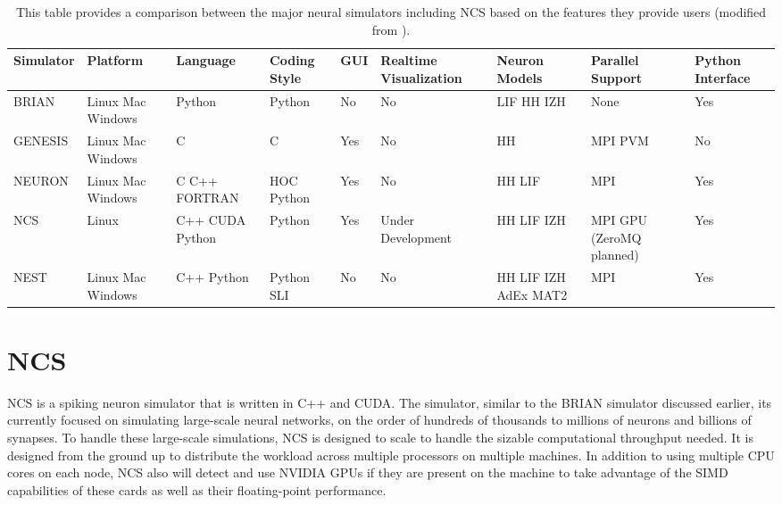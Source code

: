 \begin{table}
\def\arraystretch{1.5}
{\tiny
\begin{tabular}{ l | p{0.5in} | p{0.5in} | p{0.60in} | l | p{0.70in} | p{0.5in} | p{0.50in} | p{0.4in} }
Simulator & Platform & Language & Coding Style & GUI & Realtime \newline Visualization & Neuron Models & Parallel Support & Python Interface \\
\hline
BRIAN & Linux Mac Windows & Python & Python & No & No & LIF HH IZH & None & Yes \\
\hline
GENESIS & Linux Mac Windows & C & C & Yes & No & HH & MPI PVM & No \\
\hline
NEURON & Linux Mac Windows & C C++ FORTRAN & HOC Python & Yes & No & HH LIF & MPI & Yes \\
\hline
NCS & Linux & C++ CUDA Python & Python & Yes & Under Development & HH LIF IZH & MPI GPU (ZeroMQ planned) & Yes \\
\hline
NEST & Linux Mac Windows & C++ Python & Python SLI & No & No & HH LIF IZH AdEx MAT2 & MPI & Yes \\
\hline

\end{tabular}
}
\caption[Simulator Comparison \cite{hoang2013novel}]{This table provides a comparison between the major neural simulators including NCS based on the features they provide users (modified from \cite{hoang2013novel}).\label{table:sim_comparison}\vspace{0.25in}}
\end{table}

\section{NCS}

NCS is a spiking neuron simulator that is written in C++ and CUDA. The simulator, similar to the BRIAN simulator discussed earlier, its currently focused on simulating large-scale neural networks, on the order of hundreds of thousands to millions of neurons and billions of synapses\cite{hoang2013novel, thibeault2011novel}. To handle these large-scale simulations, NCS is designed to scale to handle the sizable computational throughput needed. It is designed from the ground up to distribute the workload across multiple processors on multiple machines. In addition to using multiple CPU cores on each node, NCS also will detect and use NVIDIA GPUs if they are present on the machine to take advantage of the SIMD capabilities of these cards as well as their floating-point performance\cite{thibeault2011novel}.

